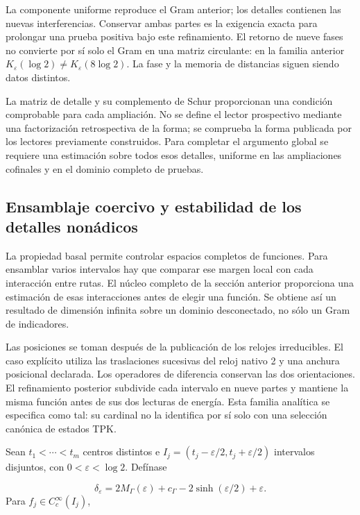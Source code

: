 La componente uniforme reproduce el Gram anterior; los detalles contienen las nuevas interferencias. Conservar ambas partes es la exigencia exacta para prolongar una prueba positiva bajo este refinamiento. El retorno de nueve fases no convierte por sí solo el Gram en una matriz circulante: en la familia anterior \(K_\varepsilon(\log2)\neq K_\varepsilon(8\log2)\). La fase y la memoria de distancias siguen siendo datos distintos.

La matriz de detalle y su complemento de Schur proporcionan una condición comprobable para cada ampliación. No se define el lector prospectivo mediante una factorización retrospectiva de la forma; se comprueba la forma publicada por los lectores previamente construidos. Para completar el argumento global se requiere una estimación sobre todos esos detalles, uniforme en las ampliaciones cofinales y en el dominio completo de pruebas.

\subsection{Ensamblaje coercivo y estabilidad de los detalles nonádicos}
\label{viii:rz:ensamblaje}
La propiedad basal permite controlar espacios completos de funciones. Para ensamblar varios intervalos hay que comparar ese margen local con cada interacción entre rutas. El núcleo completo de la sección anterior proporciona una estimación de esas interacciones antes de elegir una función. Se obtiene así un resultado de dimensión infinita sobre un dominio desconectado, no sólo un Gram de indicadores.

Las posiciones se toman después de la publicación de los relojes irreducibles. El caso explícito utiliza las traslaciones sucesivas del reloj nativo 2 y una anchura posicional declarada. Los operadores de diferencia conservan las dos orientaciones. El refinamiento posterior subdivide cada intervalo en nueve partes y mantiene la misma función antes de sus dos lecturas de energía. Esta familia analítica se especifica como tal: su cardinal no la identifica por sí solo con una selección canónica de estados TPK.

Sean \(t_1<\cdots<t_m\) centros distintos e \(I_j=(t_j-\varepsilon/2,t_j+\varepsilon/2)\) intervalos disjuntos, con \(0<\varepsilon<\log2\). Defínase

\[
\delta_\varepsilon=2M_\Gamma(\varepsilon)+c_\Gamma
-2\sinh(\varepsilon/2)+\varepsilon.
\]
Para \(f_j\in C_c^\infty(I_j)\),

